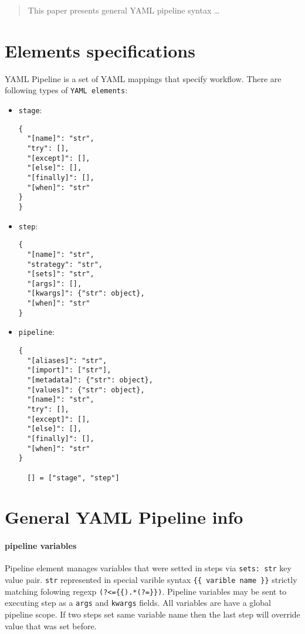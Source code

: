 \documentclass[11pt]{article}
\begin{document}
\maketitle

\begin{abstract}
This paper presents general YAML pipeline syntax \ldots
\end{abstract}

\section{Elements specifications}
YAML Pipeline is a set of YAML mappings that specify workflow.
There are following types of \verb|YAML elements|:
\begin{itemize}
  \item \verb|stage|:
    \begin{verbatim}
{
  "[name]": "str",
  "try": [],
  "[except]": [],
  "[else]": [],
  "[finally]": [],
  "[when]": "str"
}
}\end{verbatim}
  \item \verb|step|:
  \begin{verbatim}
{
  "[name]": "str",
  "strategy": "str",
  "[sets]": "str",
  "[args]": [],
  "[kwargs]": {"str": object},
  "[when]": "str"
}
  \end{verbatim}
  \item \verb|pipeline|:
  \begin{verbatim}
{
  "[aliases]": "str",
  "[import]": ["str"],
  "[metadata]": {"str": object},
  "[values]": {"str": object},
  "[name]": "str",  
  "try": [],
  "[except]": [],
  "[else]": [],
  "[finally]": [],
  "[when]": "str"
}
  
  [] = ["stage", "step"]
  \end{verbatim}
\end{itemize}

\section{General YAML Pipeline info}\label{general_info}
\paragraph{pipeline variables}Pipeline element manages variables that were setted in steps via \verb|sets: str| key value pair. \verb|str| represented in special varible syntax \verb|{{ varible name }}| strictly matching folowing regexp \verb|(?<={{).*(?=}})|. Pipeline variables may be sent to executing step as a \verb|args| and \verb|kwargs| fields. All variables are have a global pipeline scope. If two steps set same variable name then the last step will override value that was set before.
\end{document}
